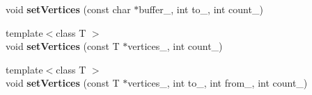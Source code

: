 \begin{DoxyCompactItemize}
\item 
void {\bfseries set\+Vertices} (const char $\ast$buffer\+\_\+, int to\+\_\+, int count\+\_\+)\hypertarget{class_magnum_1_1_g_x_vertex_buffer_ae24fd2edb9b65e435d6f57fc36de9f4d}{}\label{class_magnum_1_1_g_x_vertex_buffer_ae24fd2edb9b65e435d6f57fc36de9f4d}

\item 
{\footnotesize template$<$class T $>$ }\\void {\bfseries set\+Vertices} (const T $\ast$vertices\+\_\+, int count\+\_\+)\hypertarget{class_magnum_1_1_g_x_vertex_buffer_ad939e078a35f95320dfcce77dacc4823}{}\label{class_magnum_1_1_g_x_vertex_buffer_ad939e078a35f95320dfcce77dacc4823}

\item 
{\footnotesize template$<$class T $>$ }\\void {\bfseries set\+Vertices} (const T $\ast$vertices\+\_\+, int to\+\_\+, int from\+\_\+, int count\+\_\+)\hypertarget{class_magnum_1_1_g_x_vertex_buffer_ab7a2bdd689a38a1504b6c7b9c0943198}{}\label{class_magnum_1_1_g_x_vertex_buffer_ab7a2bdd689a38a1504b6c7b9c0943198}

\end{DoxyCompactItemize}

